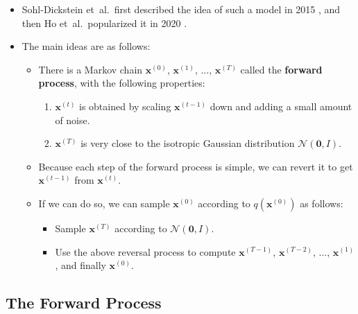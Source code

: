 \documentclass[10pt]{article}
\newcommand{\ve}[1]{\mathbf{#1}}
\newcommand{\etal}{{et~al.}}
\newcommand{\mcal}[1]{\mathcal{#1}}
\begin{document}
\begin{itemize}
  \item Sohl-Dickstein \etal\ first described the idea of such a model in 2015 \cite{SohlDickstein:2015}, and then Ho \etal\ popularized it in 2020 \cite{Ho:2020}.
  
  \item The main ideas are as follows:
  \begin{itemize}
    \item There is a Markov chain $\ve{x}^{(0)}$, ${\ve{x}}^{(1)}$, $\dotsc$, ${\ve{x}}^{(T)}$ called the {\bf forward process}, with the following properties:
    \begin{enumerate}
      \item $\ve{x}^{(t)}$ is obtained by scaling $\ve{x}^{(t-1)}$ down and adding a small amount of noise.
      \item $\ve{x}^{(T)}$ is very close to the isotropic Gaussian distribution $\mcal{N}(\ve{0}, I)$.
    \end{enumerate}

    \item Because each step of the forward process is simple, we can revert it to get $\ve{x}^{(t-1)}$ from $\ve{x}^{(t)}$.
    
    \item If we can do so, we can sample $\ve{x}^{(0)}$ according to $q(\ve{x}^{(0)})$ as follows:
    \begin{itemize}
      \item Sample $\ve{x}^{(T)}$ according to $\mcal{N}(\ve{0}, I)$.
      \item Use the above reversal process to compute $\ve{x}^{(T-1)}$, $\ve{x}^{(T-2)}$, $\dotsc$, $\ve{x}^{(1)}$, and finally $\ve{x}^{(0)}$.
    \end{itemize}
  \end{itemize}
\end{itemize}

\subsection{The Forward Process}
\end{document}
